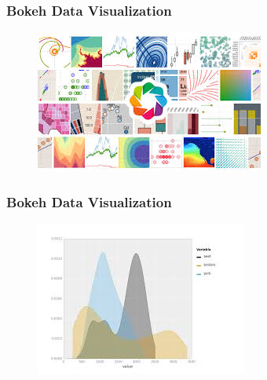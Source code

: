 \documentclass[MASTER.tex]{subfiles}
\begin{document}
\begin{frame}
	\frametitle{Bokeh Data Visualization}
		\begin{figure}
\centering
\includegraphics[width=1.0\linewidth]{bokehlogo}
\end{figure}

\end{frame}
\begin{frame}
	\frametitle{Bokeh Data Visualization}

\begin{figure}
\centering
\includegraphics[width=1.0\linewidth]{bokehplot}

\end{figure}
	
\end{frame}
\end{document}
